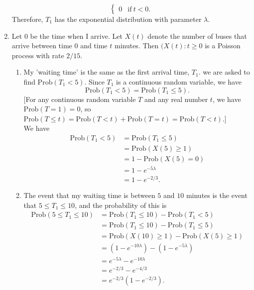 \documentclass[11pt,a4paper]{article}
\begin{document}
\begin{enumerate}
$$\begin{cases}
            0 & \text{if}\ t<0.
        \end{cases}
        $$
        Therefore, $T_1$ has the exponential distribution with parameter $\lambda$.
        \item Let $0$ be the time when I arrive. Let $X(t)$ denote the number of buses that arrive between time $0$ and time $t$ minutes. Then $(X(t) : t \geq 0$ is a Poisson process with rate $2/15$.
        \begin{enumerate}
            \item My 'waiting time' is the same as the first arrival time, $T_1$. we are asked to find $\text{Prob}(T_1 < 5)$. Since $T_1$ is a continuous random variable, we have
            $$
            \text{Prob}(T_1<5) = \text{Prob}(T_1 \leq 5).
            $$
            [For any continuous random variable $T$ and any real number $t$, we have $\text{Prob}(T=1)=0$, so $\text{Prob}(T \leq t) = \text{Prob}(T < t)+ \text{Prob}(T = t)= \text{Prob}(T < t)$.]\\
            We have
            \begin{align*}
                \text{Prob}(T_1<5)
                &= \text{Prob}(T_1 \leq 5)\\
                &= \text{Prob}(X(5)\geq 1)\\
                &= 1- \text{Prob}(X(5)=0)\\
                &= 1- e^{-5\lambda}\\
                &= 1-e^{-2/3}.
            \end{align*}
            \item The event that my waiting time is between $5$ and $10$ minutes is the event that $5 \leq T_1 \leq 10$, and the probability of this is
            \begin{align*}
                \text{Prob}(5 \leq T_1 \leq 10)
                &= \text{Prob}(T_1 \leq 10) - \text{Prob}(T_1 < 5)\\
                &= \text{Prob}(T_1 \leq 10) - \text{Prob}(T_1 \leq 5)\\
                &= \text{Prob}(X(10) \geq 1) - \text{Prob}(X(5) \geq 1)\\
                &= (1-e^{-10\lambda}) - (1-e^{-5\lambda})\\
                &= e^{-5\lambda} - e^{-10\lambda}\\
                &= e^{-2/3}-e^{-4/3}\\
                &= e^{-2/3}(1-e^{-2/3}).
            \end{align*}

\end{enumerate}
\end{enumerate}
\end{document}
